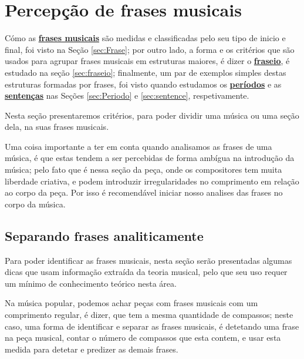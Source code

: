 \newpage
\section{Percepção de frases musicais}
\label{sec:perceberfrases}

Cómo as \hyperref[sec:Frase]{\textbf{frases musicais}} são medidas e classificadas pelo seu tipo de inicio e final,
foi visto na Seção \ref{sec:Frase};
por outro lado, a forma e os critérios que são usados para agrupar frases musicais em estruturas maiores, 
é dizer o \hyperref[sec:fraseio]{\textbf{fraseio}}, 
é estudado na seção \ref{sec:fraseio};
finalmente, um par de exemplos simples destas estruturas formadas por frases,
foi visto quando estudamos os \hyperref[sec:Periodo]{\textbf{períodos}} e 
as \hyperref[sec:sentence]{\textbf{sentenças}} nas Seções \ref{sec:Periodo} e \ref{sec:sentence}, 
respetivamente.

Nesta seção presentaremos critérios, para poder dividir uma música ou uma seção dela,
na suas frases musicais. 


\begin{tcbattention}
Uma coisa importante a ter em conta quando analisamos as frases de uma música,
é que estas tendem a ser percebidas de forma ambígua na introdução da música;
pelo fato que é nessa seção da peça, onde os compositores tem muita liberdade criativa,
e podem introduzir irregularidades no comprimento em relação ao corpo da peça. 
Por isso é recomendável iniciar nosso analises das frases no corpo da música. 
\end{tcbattention}

\subsection{Separando frases analiticamente}

Para poder identificar as frases musicais, 
nesta seção serão presentadas algumas dicas que usam informação extraída da teoria musical,
pelo que seu uso requer um mínimo de conhecimento teórico nesta área. 




Na música popular, podemos achar peças com frases musicais com um comprimento regular,
é dizer, que  tem a mesma quantidade de compassos;
neste caso, uma forma de identificar e separar as frases musicais, 
é detetando uma frase na peça musical,
contar o número de compassos que esta contem, 
e usar esta medida para detetar e predizer as demais frases.


